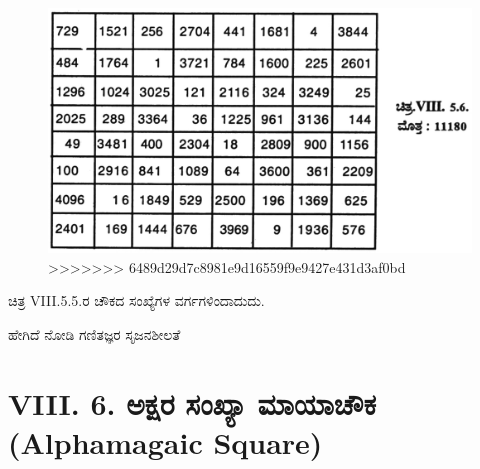 \begin{figure}[H]
\includegraphics[scale=0.85]{src/figures/chap7/fig7.20.jpg}
>>>>>>> 6489d29d7c8981e9d16559f9e9427e431d3af0bd
\end{figure}

ಚಿತ್ರ VIII.5.5.ರ ಚೌಕದ ಸಂಖ್ಯೆಗಳ ವರ್ಗಗಳಿಂದಾದುದು.

ಹೇಗಿದೆ ನೋಡಿ ಗಣಿತಜ್ಞರ ಸೃಜನಶೀಲತೆ

\section*{VIII. 6. ಅಕ್ಷರ ಸಂಖ್ಯಾ ಮಾಯಾಚೌಕ (Alphamagaic Square)}

